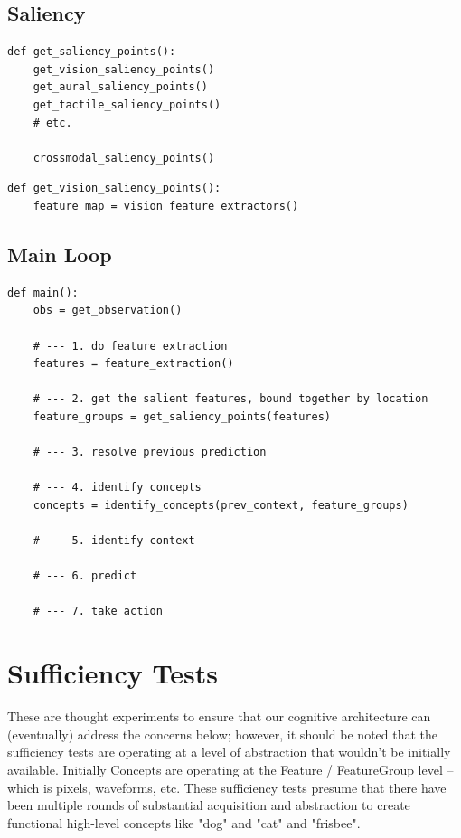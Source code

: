 \documentclass{article}
\begin{document}
\subsection{Saliency}\label{pseudocode:saliency}
\begin{verbatim}
def get_saliency_points():
    get_vision_saliency_points()
    get_aural_saliency_points()
    get_tactile_saliency_points()
    # etc.

    crossmodal_saliency_points()
\end{verbatim}

\begin{verbatim}
def get_vision_saliency_points():
    feature_map = vision_feature_extractors()
\end{verbatim}

\subsection{Main Loop}\label{pseudocode:main-loop}
\begin{verbatim}
def main():
    obs = get_observation()

    # --- 1. do feature extraction
    features = feature_extraction()

    # --- 2. get the salient features, bound together by location
    feature_groups = get_saliency_points(features)

    # --- 3. resolve previous prediction

    # --- 4. identify concepts
    concepts = identify_concepts(prev_context, feature_groups)

    # --- 5. identify context

    # --- 6. predict

    # --- 7. take action
\end{verbatim}

\section{Sufficiency Tests}
These are thought experiments to ensure that our cognitive architecture can (eventually) address the concerns below; however, it should be noted that the sufficiency tests are operating at a level of abstraction that wouldn't be initially available. Initially Concepts are operating at the Feature / FeatureGroup level -- which is pixels, waveforms, etc. These sufficiency tests presume that there have been multiple rounds of substantial acquisition and abstraction to create functional high-level concepts like "dog" and "cat" and "frisbee".
\end{document}

